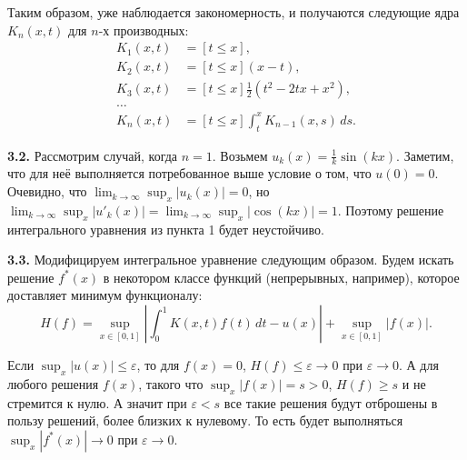 \documentclass[a4paper, 12pt, onepage]{article}
\begin{document}
Таким образом, уже наблюдается закономерность, и получаются следующие
ядра $K_n(x, t)$ для $n$-х производных:
\begin{align*}
  K_1(x, t) &= [t \leqslant x], \\
  K_2(x, t) &= [t \leqslant x] (x - t), \\
  K_3(x, t) &= [t \leqslant x] \frac12 (t^2 - 2tx + x^2), \\
  \ldots  \\
  K_n(x, t) &= [t \leqslant x] \int_t^x K_{n-1}(x, s) \, ds.
\end{align*}

\textbf{3.2.} Рассмотрим случай, когда $n=1$.
Возьмем $u_k(x) = \frac1k \sin(kx)$. Заметим, что для неё выполняется потребованное выше условие о том, что $u(0)=0$.
Очевидно, что $\lim_{k\to\infty} \sup_x |u_k(x)| = 0$, но
$\lim_{k\to\infty} \sup_x |u'_k(x)| = \lim_{k\to\infty} \sup_x |\cos(kx)| = 1.$
Поэтому решение интегрального уравнения из пункта 1 будет неустойчиво.

\textbf{3.3.} Модифицируем интегральное уравнение следующим образом. Будем искать решение $f^*(x)$ в некотором классе
функций (непрерывных, например), которое доставляет минимум функционалу:
$$H(f) = \sup_{x \in [0, 1]} \left|\int_0^1 K(x, t) f(t) \, dt - u(x)\right| + \sup_{x \in [0, 1]} |f(x)|. $$

Если $\sup_x |u(x)| \leqslant \varepsilon$, то для $f(x) = 0$, $H(f) \leqslant \varepsilon \to 0$ при $\varepsilon \to 0$.
А для любого решения $f(x)$, такого что $\sup_x |f(x)| = s > 0$, $H(f) \geqslant s$ и не стремится к нулю.
А значит при $\varepsilon < s$ все такие решения будут отброшены в пользу решений, более близких к нулевому.
То есть будет выполняться $\sup_x |f^*(x)| \to 0$ при $\varepsilon \to 0$.
\end{document}
